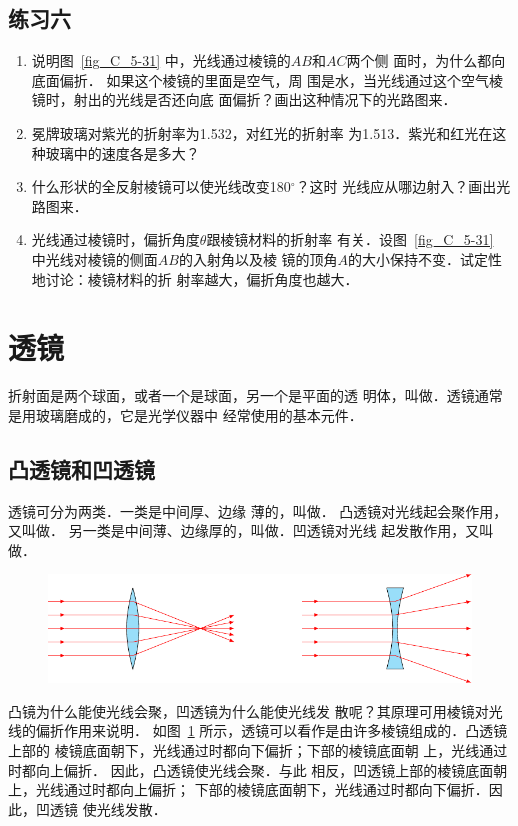 \subsection*{练习六}
\begin{enumerate}
    \item 说明图~\ref{fig_C_5-31} 中，光线通过棱镜的$AB$和$AC$两个侧
面时，为什么都向底面偏折．
如果这个棱镜的里面是空气，周
围是水，当光线通过这个空气棱镜时，射出的光线是否还向底
面偏折？画出这种情况下的光路图来．
\item 冕牌玻璃对紫光的折射率为1.532，对红光的折射率
为1.513．紫光和红光在这种玻璃中的速度各是多大？
\item 什么形状的全反射棱镜可以使光线改变180$^\circ$？这时
光线应从哪边射入？画出光路图来．
\item 光线通过棱镜时，偏折角度$\theta$跟棱镜材料的折射率
有关．设图~\ref{fig_C_5-31} 中光线对棱镜的侧面$AB$的入射角以及棱
镜的顶角$A$的大小保持不变．试定性地讨论：棱镜材料的折
射率越大，偏折角度也越大．
\end{enumerate}

\section{透镜}
折射面是两个球面，或者一个是球面，另一个是平面的透
明体，叫做．透镜通常是用玻璃磨成的，它是光学仪器中
经常使用的基本元件．

\subsection{凸透镜和凹透镜}

透镜可分为两类．一类是中间厚、边缘
薄的，叫做．
凸透镜对光线起会聚作用，又叫做．
另一类是中间薄、边缘厚的，叫做．凹透镜对光线
起发散作用，又叫做．
\begin{figure}[htbp]
    \centering
    \includegraphics{fig/C/5-34.pdf}
    \caption{}\label{fig_C_5-34}
\end{figure}


凸镜为什么能使光线会聚，凹透镜为什么能使光线发
散呢？其原理可用棱镜对光线的偏折作用来说明．
如图~\ref{fig_C_5-34} 所示，透镜可以看作是由许多棱镜组成的．凸透镜上部的
棱镜底面朝下，光线通过时都向下偏折；下部的棱镜底面朝
上，光线通过时都向上偏折．
因此，凸透镜使光线会聚．与此
相反，凹透镜上部的棱镜底面朝上，光线通过时都向上偏折；
下部的棱镜底面朝下，光线通过时都向下偏折．因此，凹透镜
使光线发散．

